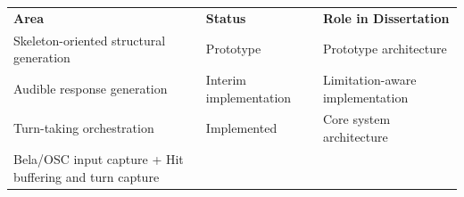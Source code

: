 {\def\LTcaptype{none} %
\begin{longtable}[]{@{}
  >{\raggedright\arraybackslash}p{}
  >{\raggedright\arraybackslash}p{}
  >{\raggedright\arraybackslash}p{}@{}}
\toprule\noalign{}
\begin{minipage}[b]{\linewidth}\raggedright
\textbf{Area}
\end{minipage} & \begin{minipage}[b]{\linewidth}\raggedright
\textbf{Status}
\end{minipage} & \begin{minipage}[b]{\linewidth}\raggedright
\textbf{Role in Dissertation}
\end{minipage} \\
\begin{minipage}[b]{\linewidth}\raggedright
Skeleton-oriented structural generation
\end{minipage} & \begin{minipage}[b]{\linewidth}\raggedright
Prototype
\end{minipage} & \begin{minipage}[b]{\linewidth}\raggedright
Prototype architecture
\end{minipage} \\
\begin{minipage}[b]{\linewidth}\raggedright
Audible response generation
\end{minipage} & \begin{minipage}[b]{\linewidth}\raggedright
Interim implementation
\end{minipage} & \begin{minipage}[b]{\linewidth}\raggedright
Limitation-aware implementation
\end{minipage} \\
\begin{minipage}[b]{\linewidth}\raggedright
Turn-taking orchestration
\end{minipage} & \begin{minipage}[b]{\linewidth}\raggedright
Implemented
\end{minipage} & \begin{minipage}[b]{\linewidth}\raggedright
Core system architecture
\end{minipage} \\
\begin{minipage}[b]{\linewidth}\raggedright
Bela/OSC input capture + Hit buffering and turn capture

\end{minipage}
\end{longtable}}
